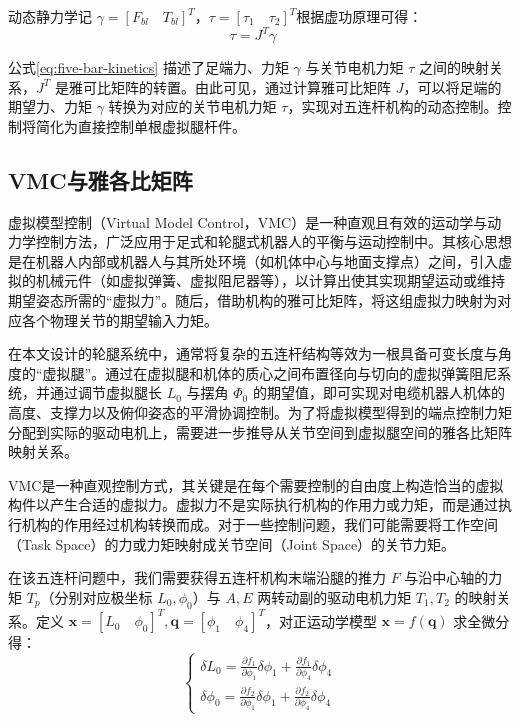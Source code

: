 动态静力学记 $\gamma = [F_{bl} \quad T_{bl}]^T$，$\tau = [\tau_1 \quad \tau_2]^T$根据虚功原理可得：
\begin{equation}
    \tau = J^T \gamma \quad
    \label{eq:five-bar-kinetics}
\end{equation}

公式\ref{eq:five-bar-kinetics} 描述了足端力、力矩 $\gamma$ 与关节电机力矩 $\tau$ 之间的映射关系，$J^T$ 是雅可比矩阵的转置。由此可见，通过计算雅可比矩阵 $J$，可以将足端的期望力、力矩 $\gamma$ 转换为对应的关节电机力矩 $\tau$，实现对五连杆机构的动态控制。控制将简化为直接控制单根虚拟腿杆件。

\subsection{VMC与雅各比矩阵}
虚拟模型控制（Virtual Model Control，VMC）是一种直观且有效的运动学与动力学控制方法，广泛应用于足式和轮腿式机器人的平衡与运动控制中。其核心思想是在机器人内部或机器人与其所处环境（如机体中心与地面支撑点）之间，引入虚拟的机械元件（如虚拟弹簧、虚拟阻尼器等），以计算出使其实现期望运动或维持期望姿态所需的“虚拟力”。随后，借助机构的雅可比矩阵，将这组虚拟力映射为对应各个物理关节的期望输入力矩。

在本文设计的轮腿系统中，通常将复杂的五连杆结构等效为一根具备可变长度与角度的“虚拟腿”。通过在虚拟腿和机体的质心之间布置径向与切向的虚拟弹簧阻尼系统，并通过调节虚拟腿长 $L_0$ 与摆角 $\varPhi_0$ 的期望值，即可实现对电缆机器人机体的高度、支撑力以及俯仰姿态的平滑协调控制。为了将虚拟模型得到的端点控制力矩分配到实际的驱动电机上，需要进一步推导从关节空间到虚拟腿空间的雅各比矩阵映射关系。

VMC是一种直观控制方式，其关键是在每个需要控制的自由度上构造恰当的虚拟构件以产生合适的虚拟力。虚拟力不是实际执行机构的作用力或力矩，而是通过执行机构的作用经过机构转换而成。对于一些控制问题，我们可能需要将工作空间（Task Space）的力或力矩映射成关节空间（Joint Space）的关节力矩。

在该五连杆问题中，我们需要获得五连杆机构末端沿腿的推力 $F$ 与沿中心轴的力矩 $T_p$（分别对应极坐标 $L_0, \phi_0$）与 $A, E$ 两转动副的驱动电机力矩 $T_1, T_2$ 的映射关系。定义 $\boldsymbol{x} = [L_0 \quad \phi_0]^T, \boldsymbol{q} = [\phi_1 \quad \phi_4]^T$，对正运动学模型 $\boldsymbol{x} = f(\boldsymbol{q})$ 求全微分得：
\begin{equation}
    \begin{cases}
        \delta L_0 = \frac{\partial f_1}{\partial \phi_1} \delta \phi_1 + \frac{\partial f_1}{\partial \phi_4} \delta \phi_4 \\
        \delta \phi_0 = \frac{\partial f_2}{\partial \phi_1} \delta \phi_1 + \frac{\partial f_2}{\partial \phi_4} \delta \phi_4
    \end{cases}
    \label{eq:differential}
\end{equation}

